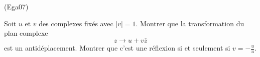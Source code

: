 \begin{tiny}(Ega07)\end{tiny} Soit $u$ et $v$ des complexes fixés avec $|v|=1$. Montrer que la transformation du plan complexe 
\begin{displaymath}
 z\rightarrow u+ v\overline{z}
\end{displaymath}
est un antidéplacement. Montrer que c'est une réflexion si et seulement si $v=-\frac{u}{\overline{u}}$.
